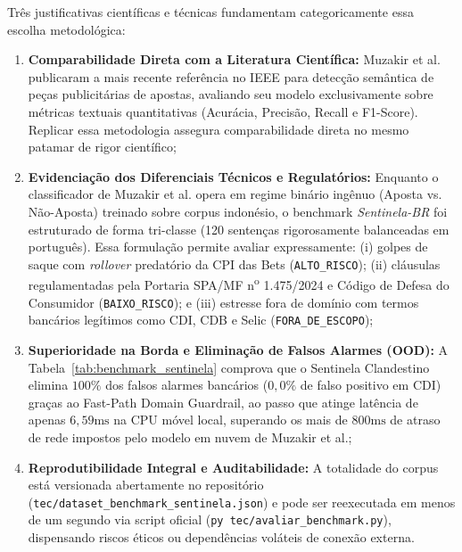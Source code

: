 Tr\^{e}s justificativas cient\'{i}ficas e t\'{e}cnicas fundamentam categoricamente essa escolha metodol\'{o}gica:
\begin{enumerate}
    \item \textbf{Comparabilidade Direta com a Literatura Cient\'{i}fica:} Muzakir et al.~\cite{muzakir2025text} publicaram a mais recente refer\^{e}ncia no IEEE para detec\c{c}\~{a}o sem\^{a}ntica de pe\c{c}as publicit\'{a}rias de apostas, avaliando seu modelo exclusivamente sobre m\'{e}tricas textuais quantitativas (Acur\'{a}cia, Precis\~{a}o, Recall e F1-Score). Replicar essa metodologia assegura comparabilidade direta no mesmo patamar de rigor cient\'{i}fico;
    \item \textbf{Evidencia\c{c}\~{a}o dos Diferenciais Técnicos e Regulat\'{o}rios:} Enquanto o classificador de Muzakir et al. opera em regime bin\'{a}rio ing\^{e}nuo (Aposta vs. N\~{a}o-Aposta) treinado sobre corpus indon\'{e}sio, o benchmark \textit{Sentinela-BR} foi estruturado de forma tri-classe (120 senten\c{c}as rigorosamente balanceadas em portugu\^{e}s). Essa formula\c{c}\~{a}o permite avaliar expressamente: (i) golpes de saque com \textit{rollover} predat\'{o}rio da CPI das Bets (\texttt{ALTO\_RISCO}); (ii) cl\'{a}usulas regulamentadas pela Portaria SPA/MF n\textsuperscript{o} 1.475/2024 e C\'{o}digo de Defesa do Consumidor (\texttt{BAIXO\_RISCO}); e (iii) estresse fora de dom\'{i}nio com termos banc\'{a}rios leg\'{i}timos como CDI, CDB e Selic (\texttt{FORA\_DE\_ESCOPO});
    \item \textbf{Superioridade na Borda e Elimina\c{c}\~{a}o de Falsos Alarmes (OOD):} A Tabela~\ref{tab:benchmark_sentinela} comprova que o Sentinela Clandestino elimina $100\%$ dos falsos alarmes banc\'{a}rios ($0{,}0\%$ de falso positivo em CDI) gra\c{c}as ao Fast-Path Domain Guardrail, ao passo que atinge lat\^{e}ncia de apenas $6{,}59\text{ms}$ na CPU m\'{o}vel local, superando os mais de $800\text{ms}$ de atraso de rede impostos pelo modelo em nuvem de Muzakir et al.;
    \item \textbf{Reprodutibilidade Integral e Auditabilidade:} A totalidade do corpus est\'{a} versionada abertamente no reposit\'{o}rio (\texttt{tec/dataset\_benchmark\_sentinela.json}) e pode ser reexecutada em menos de um segundo via script oficial (\texttt{py tec/avaliar\_benchmark.py}), dispensando riscos \'{e}ticos ou depend\^{e}ncias vol\'{a}teis de conex\~{a}o externa.
\end{enumerate}

